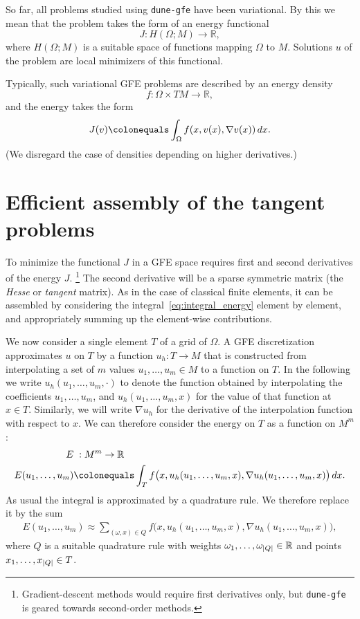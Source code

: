 \documentclass[a4paper]{article}
\newcommand{\dunemodule}[1]{\texttt{#1}}
\newcommand{\R}{\mathbb R}
\DeclarePairedDelimiter{\abs}{\lvert}{\rvert}
\begin{document}
So far, all problems studied using \dunemodule{dune-gfe} have been variational.
By this we mean that the problem takes the form of an energy functional
\begin{equation*}
 J : H(\Omega;M) \to \R,
\end{equation*}
where $H(\Omega;M)$ is a suitable space of functions mapping $\Omega$ to $M$.
Solutions $u$ of the problem are local minimizers of this functional.

Typically, such variational GFE problems are described by an energy density
\begin{equation*}
 f : \Omega \times TM \to \R,
\end{equation*}
and the energy takes the form
\begin{equation}
\label{eq:integral_energy}
 J(v)
 \colonequals
 \int_\Omega f(x, v(x), \nabla v(x))\,dx.
\end{equation}
(We disregard the case of densities depending on higher derivatives.)


\section{Efficient assembly of the tangent problems}

To minimize the functional $J$ in a GFE space requires first and second derivatives
of the energy $J$.%
%
\footnote{Gradient-descent methods would require first derivatives only, but \dunemodule{dune-gfe}
is geared towards second-order methods.}
%
The second derivative will be a sparse symmetric matrix
(the \emph{Hesse} or \emph{tangent} matrix).  As in the case of classical
finite elements, it can be assembled by considering the integral~\eqref{eq:integral_energy}
element by element, and appropriately summing up the element-wise contributions.

We now consider a single element $T$ of a grid of $\Omega$.
A GFE discretization approximates $u$ on $T$ by a function $u_h : T \to M$
that is constructed from interpolating a set of $m$ values $u_1,\dots,u_m \in M$
to a function on $T$. In the following we write $u_h(u_1,\dots,u_m,\cdot)$ to denote
the function obtained by interpolating the coefficients $u_1,\dots,u_m$, and
$u_h(u_1,\dots,u_m,x)$ for the value of that function at $x \in T$. Similarly,
we will write $\nabla u_h$ for the derivative of the interpolation function
with respect to $x$. We can therefore consider the energy on $T$ as a
function on $M^m$:
\begin{align*}
 E & \; : M^m \to \R
 \\
 E(u_1,\dots,u_m)
 & \colonequals
 \int_T f\big(x, u_h(u_1,\dots,u_m,x), \nabla u_h(u_1,\dots,u_m,x) \big)\,dx.
\end{align*}
As usual the integral is approximated by a quadrature rule.  We therefore replace it
by the sum
\begin{align}
\label{eq:integral_energy_quadrature}
 E(u_1,\dots,u_m)
 \approx
 \sum_{(\omega,x) \in Q} f\big(x, u_h(u_1,\dots,u_m,x), \nabla u_h(u_1,\dots,u_m,x) \big),
\end{align}
where $Q$ is a suitable quadrature rule with weights $\omega_1,\dots,\omega_{\abs{Q}} \in \R$
and points $x_1,\dots,x_{\abs{Q}} \in T$.
\end{document}
